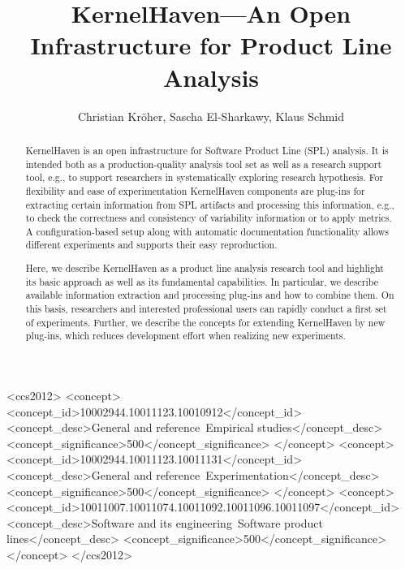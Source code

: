 \title{KernelHaven---An Open Infrastructure for Product Line Analysis}
\author{Christian Kröher, Sascha El-Sharkawy, Klaus Schmid}


\begin{abstract}
KernelHaven is an open infrastructure for Software Product Line (SPL) analysis. It is intended both as a production-quality analysis tool set as well as a research support tool, e.g., to support researchers in systematically exploring research hypothesis. For flexibility and ease of experimentation KernelHaven components are plug-ins for extracting certain information from SPL artifacts and processing this information, e.g., to check the correctness and consistency of variability information or to apply metrics. A configuration-based setup along with  automatic documentation functionality allows different experiments and supports their easy reproduction.

Here, we describe KernelHaven as a product line analysis research tool and highlight its basic approach as well as its fundamental capabilities. In particular, we describe available information extraction and processing plug-ins and how to combine them. 
On this basis, researchers and interested professional users can rapidly conduct a first set of experiments. Further, we describe the concepts for extending KernelHaven by new plug-ins, which reduces development effort when realizing new experiments.
\end{abstract}


%
%
\begin{CCSXML}
<ccs2012>
<concept>
<concept_id>10002944.10011123.10010912</concept_id>
<concept_desc>General and reference~Empirical studies</concept_desc>
<concept_significance>500</concept_significance>
</concept>
<concept>
<concept_id>10002944.10011123.10011131</concept_id>
<concept_desc>General and reference~Experimentation</concept_desc>
<concept_significance>500</concept_significance>
</concept>
<concept>
<concept_id>10011007.10011074.10011092.10011096.10011097</concept_id>
<concept_desc>Software and its engineering~Software product lines</concept_desc>
<concept_significance>500</concept_significance>
</concept>
</ccs2012>
\end{CCSXML}


